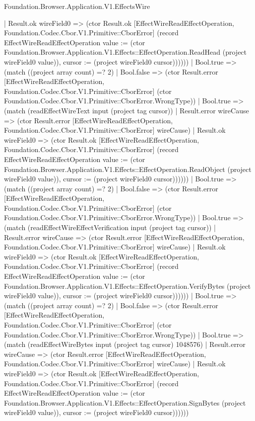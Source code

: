 \begin{lexlean}{Foundation.Browser.Application.V1.EffectsWire}
\begin{semanticmodule}
{                        | Result.ok wireField0 => (ctor Result.ok [EffectWireReadEffectOperation, Foundation.Codec.Cbor.V1.Primitive::CborError] (record EffectWireReadEffectOperation {value := (ctor Foundation.Browser.Application.V1.Effects::EffectOperation.ReadHead (project wireField0 value)), cursor := (project wireField0 cursor)})))))
                  | Bool.true => (match ((project array count) =? 2)
                    | Bool.false => (ctor Result.error [EffectWireReadEffectOperation, Foundation.Codec.Cbor.V1.Primitive::CborError] (ctor Foundation.Codec.Cbor.V1.Primitive::CborError.WrongType))
                    | Bool.true => (match (readEffectWireText input (project tag cursor))
                      | Result.error wireCause => (ctor Result.error [EffectWireReadEffectOperation, Foundation.Codec.Cbor.V1.Primitive::CborError] wireCause)
                      | Result.ok wireField0 => (ctor Result.ok [EffectWireReadEffectOperation, Foundation.Codec.Cbor.V1.Primitive::CborError] (record EffectWireReadEffectOperation {value := (ctor Foundation.Browser.Application.V1.Effects::EffectOperation.ReadObject (project wireField0 value)), cursor := (project wireField0 cursor)})))))
                | Bool.true => (match ((project array count) =? 2)
                  | Bool.false => (ctor Result.error [EffectWireReadEffectOperation, Foundation.Codec.Cbor.V1.Primitive::CborError] (ctor Foundation.Codec.Cbor.V1.Primitive::CborError.WrongType))
                  | Bool.true => (match (readEffectWireEffectVerification input (project tag cursor))
                    | Result.error wireCause => (ctor Result.error [EffectWireReadEffectOperation, Foundation.Codec.Cbor.V1.Primitive::CborError] wireCause)
                    | Result.ok wireField0 => (ctor Result.ok [EffectWireReadEffectOperation, Foundation.Codec.Cbor.V1.Primitive::CborError] (record EffectWireReadEffectOperation {value := (ctor Foundation.Browser.Application.V1.Effects::EffectOperation.VerifyBytes (project wireField0 value)), cursor := (project wireField0 cursor)})))))
              | Bool.true => (match ((project array count) =? 2)
                | Bool.false => (ctor Result.error [EffectWireReadEffectOperation, Foundation.Codec.Cbor.V1.Primitive::CborError] (ctor Foundation.Codec.Cbor.V1.Primitive::CborError.WrongType))
                | Bool.true => (match (readEffectWireBytes input (project tag cursor) 1048576)
                  | Result.error wireCause => (ctor Result.error [EffectWireReadEffectOperation, Foundation.Codec.Cbor.V1.Primitive::CborError] wireCause)
                  | Result.ok wireField0 => (ctor Result.ok [EffectWireReadEffectOperation, Foundation.Codec.Cbor.V1.Primitive::CborError] (record EffectWireReadEffectOperation {value := (ctor Foundation.Browser.Application.V1.Effects::EffectOperation.SignBytes (project wireField0 value)), cursor := (project wireField0 cursor)})))))
}
\end{semanticmodule}
\end{lexlean}

